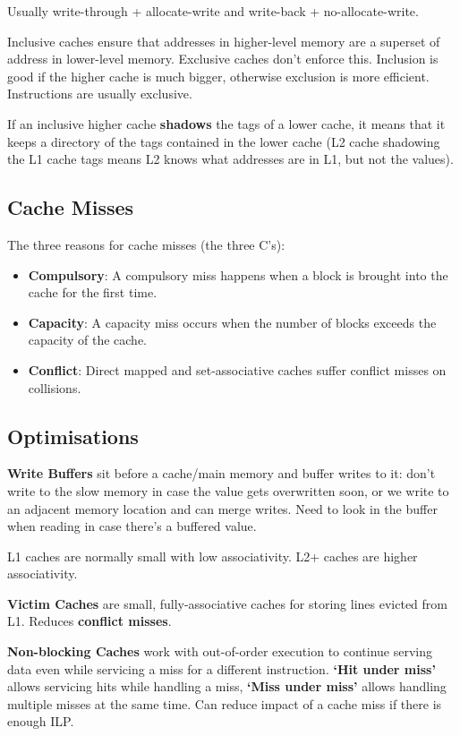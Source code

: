 \documentclass[a4paper,11pt]{article}
\begin{document}
{{        Usually write-through + allocate-write and write-back + no-allocate-write.

        Inclusive caches ensure that addresses in higher-level memory are a superset of address in lower-level memory. Exclusive caches don't enforce this. Inclusion is good if the higher cache is much bigger, otherwise exclusion is more efficient. Instructions are usually exclusive.

        If an inclusive higher cache \textbf{shadows} the tags of a lower cache, it means that it keeps a directory of the tags contained in the lower cache (L2 cache shadowing the L1 cache tags means L2 knows what addresses are in L1, but not the values).
    }
    \subsection*{Cache Misses}
    {
        The three reasons for cache misses (the three C's):

        \begin{itemize}
        \item \textbf{Compulsory}: A compulsory miss happens when a block is brought into the cache for the first time.
        \item \textbf{Capacity}: A capacity miss occurs when the number of blocks exceeds the capacity of the cache.
        \item \textbf{Conflict}: Direct mapped and set-associative caches suffer conflict misses on collisions.
        \end{itemize}
    }
    \subsection*{Optimisations}
    {
        \textbf{Write Buffers} sit before a cache/main memory and buffer writes to it: don't write to the slow memory in case the value gets overwritten soon, or we write to an adjacent memory location and can merge writes. Need to look in the buffer when reading in case there's a buffered value.

        L1 caches are normally small with low associativity. L2+ caches are higher associativity.

        \textbf{Victim Caches} are small, fully-associative caches for storing lines evicted from L1. Reduces \textbf{conflict misses}.

        \textbf{Non-blocking Caches} work with out-of-order execution to continue serving data even while servicing a miss for a different instruction. \textbf{`Hit under miss'} allows servicing hits while handling a miss, \textbf{`Miss under miss'} allows handling multiple misses at the same time. Can reduce impact of a cache miss if there is enough ILP.

}}
\end{document}
